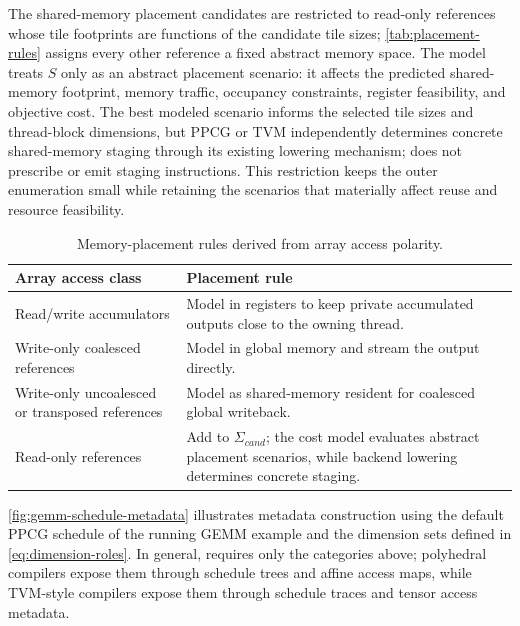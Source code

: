 The shared-memory placement candidates are restricted to read-only references whose tile footprints are functions of the candidate tile sizes; \autoref{tab:placement-rules} assigns every other reference a fixed abstract memory space. The model treats \(S\) only as an abstract placement scenario: it affects the predicted shared-memory footprint, memory traffic, occupancy constraints, register feasibility, and objective cost. The best modeled scenario informs the selected tile sizes and thread-block dimensions, but PPCG or TVM independently determines concrete shared-memory staging through its existing lowering mechanism; \name does not prescribe or emit staging instructions. This restriction keeps the outer enumeration small while retaining the scenarios that materially affect reuse and resource feasibility.

\begin{table}[tbp]
  \caption{Memory-placement rules derived from array access polarity.}
  \label{tab:placement-rules}
  \centering
  \scriptsize
  \setlength{\tabcolsep}{6pt}
  \renewcommand{\arraystretch}{1.10}
  \begin{tabularx}{0.94\textwidth}{@{}
    >{\raggedright\arraybackslash}p{}
    >{\raggedright\arraybackslash}X
    @{}}
    \toprule
    \textbf{Array access class} & \textbf{Placement rule} \\
    \midrule
    Read/write accumulators &
      Model in registers to keep private accumulated outputs close to the
      owning thread. \\
    Write-only coalesced references &
      Model in global memory and stream the output directly. \\
    Write-only uncoalesced or transposed references &
      Model as shared-memory resident for coalesced global writeback. \\
    Read-only references &
      Add to \(\Sigma_{\mathit{cand}}\); the cost model evaluates abstract
      placement scenarios, while backend lowering determines concrete staging. \\
    \bottomrule
  \end{tabularx}
\end{table}

\autoref{fig:gemm-schedule-metadata} illustrates metadata construction using the default PPCG schedule of the running GEMM example and the dimension sets defined in \autoref{eq:dimension-roles}. In general, \name requires only the categories above; polyhedral compilers expose them through schedule trees and affine access maps, while TVM-style compilers expose them through schedule traces and tensor access metadata.

